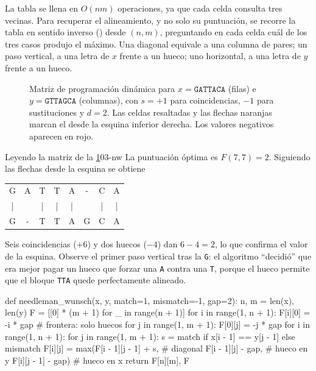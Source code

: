 La tabla se llena en $O(nm)$ operaciones, ya que cada celda consulta tres vecinas. Para recuperar el alineamiento, y no solo su puntuación, se recorre la tabla en sentido inverso () desde $(n,m)$, preguntando en cada celda cuál de los tres casos produjo el máximo. Una diagonal equivale a una columna de pares; un paso vertical, a una letra de $x$ frente a un hueco; uno horizontal, a una letra de $y$ frente a un hueco.

\begin{figure}[t]
  \centering
  
  \caption[Matriz de Needleman-Wunsch]{Matriz de programación dinámica para $x=\texttt{GATTACA}$ (filas) e $y=\texttt{GTTAGCA}$ (columnas), con $s=+1$ para coincidencias, $-1$ para sustituciones y $d=2$. Las celdas resaltadas y las flechas naranjas marcan el  desde la esquina inferior derecha. Los valores negativos aparecen en rojo.}
  \label{fig:03-nw}
\end{figure}

\begin{ejemplo}{Leyendo la matriz de la \cref{fig:03-nw}}{03-nw}
La puntuación óptima es $F(7,7)=2$. Siguiendo las flechas desde la esquina se obtiene
\begin{center}
\ttfamily\large
\begin{tabular}{@{}*{8}{c}@{}}
G & A & T & T & A & - & C & A\\
| &   & | & | & | &   & | & |\\
G & - & T & T & A & G & C & A
\end{tabular}
\end{center}
Seis coincidencias ($+6$) y dos huecos ($-4$) dan $6-4=2$, lo que confirma el valor de la esquina. Observe el primer paso vertical tras la \texttt{G}: el algoritmo ``decidió'' que era mejor pagar un hueco que forzar una \texttt{A} contra una \texttt{T}, porque el hueco permite que el bloque \texttt{TTA} quede perfectamente alineado.
\end{ejemplo}

\begin{codigo}
def needleman_wunsch(x, y, match=1, mismatch=-1, gap=2):
    n, m = len(x), len(y)
    F = [[0] * (m + 1) for _ in range(n + 1)]
    for i in range(1, n + 1): F[i][0] = -i * gap        # frontera: solo huecos
    for j in range(1, m + 1): F[0][j] = -j * gap
    for i in range(1, n + 1):
        for j in range(1, m + 1):
            s = match if x[i - 1] == y[j - 1] else mismatch
            F[i][j] = max(F[i - 1][j - 1] + s,          # diagonal
                          F[i - 1][j] - gap,            # hueco en y
                          F[i][j - 1] - gap)            # hueco en x
    return F[n][m], F
\end{codigo}

